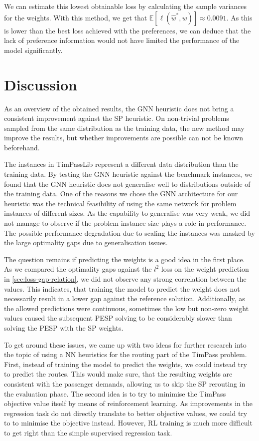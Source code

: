\documentclass[english, 12pt, a4paper, sci, utf8, a-2b, online]{aaltothesis}
\begin{document}
We can estimate this lowest obtainable loss by calculating the sample variances for the weights. With this method, we get that $\mathbb{E}[\ell(\hat{w}^*, w)] \approx 0.0091$. As this is lower than the best loss achieved with the preferences, we can deduce that the lack of preference information would not have limited the performance of the model significantly.


\clearpage
\section{Discussion}
\label{sec:discussion}

As an overview of the obtained results, the GNN heuristic does not bring a consistent improvement against the SP heuristic. On non-trivial problems sampled from the same distribution as the training data, the new method may improve the results, but whether improvements are possible can not be known beforehand.

The instances in TimPassLib represent a different data distribution than the training data. By testing the GNN heuristic against the benchmark instances, we found that the GNN heuristic does not generalise well to distributions outside of the training data. One of the reasons we chose the GNN architecture for our heuristic was the technical feasibility of using the same network for problem instances of different sizes. As the capability to generalise was very weak, we did not manage to observe if the problem instance size plays a role in performance. The possible performance degradation due to scaling the instances was masked by the large optimality gaps due to generalisation issues.

The question remains if predicting the weights is a good idea in the first place. As we compared the optimality gaps against the $l^2$ loss on the weight prediction in \cref{sec:loss-gap-relation}, we did not observe any strong correlation between the values. This indicates, that training the model to predict the weight does not necessarily result in a lower gap against the reference solution. Additionally, as the allowed predictions were continuous, sometimes the low but non-zero weight values caused the subsequent PESP solving to be considerably slower than solving the PESP with the SP weights. %

To get around these issues, we came up with two ideas for further research into the topic of using a NN heuristics for the routing part of the TimPass problem. First, instead of training the model to predict the weights, we could instead try to predict the routes. This would make sure, that the resulting weights are consistent with the passenger demands, allowing us to skip the SP rerouting in the evaluation phase. The second idea is to try to minimise the TimPass objective value itself by means of reinforcement learning. As improvements in the regression task do not directly translate to better objective values, we could try to to minimise the objective instead. However, RL training is much more difficult to get right than the simple supervised regression task.
\end{document}
